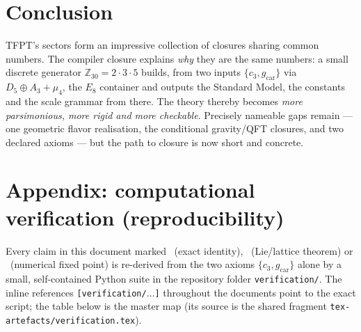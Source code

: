 \documentclass[11pt,a4paper]{article}
\newcommand{\cthree}{c_3}
\newcommand{\gcar}{g_{\mathrm{car}}}
\newcommand{\Z}{\mathbb{Z}}
\begin{document}
\section*{Conclusion}
TFPT's sectors form an impressive collection of closures sharing common numbers. The compiler
closure explains \emph{why} they are the same numbers: a small discrete generator $\Z_{30}=2\cdot3\cdot5$
builds, from two inputs $\{\cthree,\gcar\}$ via $D_5\oplus A_3+\mu_4$, the $E_8$ container and outputs
the Standard Model, the constants and the scale grammar from there. The theory thereby becomes
\emph{more parsimonious, more rigid and more checkable}. Precisely nameable gaps remain --- one
geometric flavor realisation, the conditional gravity/QFT closures, and two declared axioms --- but the
path to closure is now short and concrete.

\section*{Appendix: computational verification (reproducibility)}
Every claim in this document marked \mE\ (exact identity), \mE\ (Lie/lattice theorem) or \mE\ (numerical
fixed point) is re-derived from the two axioms $\{\cthree,\gcar\}$ alone by a small, self-contained Python
suite in the repository folder \texttt{verification/}. The inline references \texttt{[verification/$\dots$]}
throughout the documents point to the exact script; the table below is the master map (its source is
the shared fragment \texttt{tex-artefacts/verification.tex}).
\end{document}
